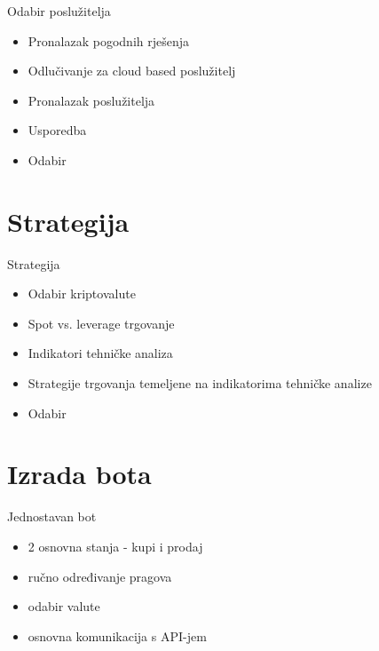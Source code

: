 \documentclass[aspectratio=169,xcolor=dvipsnames]{beamer}
\begin{document}
\begin{frame}{Odabir poslužitelja}
    \begin{itemize}
        \item Pronalazak pogodnih rješenja
        \item Odlučivanje za cloud based poslužitelj
        \item Pronalazak poslužitelja
        \item Usporedba
        \item Odabir
    \end{itemize}
\end{frame}

\section{Strategija}

\begin{frame}{Strategija}
    \begin{itemize}
        \item Odabir kriptovalute
        \item Spot vs. leverage trgovanje
        \item Indikatori tehničke analiza
        \item Strategije trgovanja temeljene na indikatorima tehničke analize
        \item Odabir
    \end{itemize}
\end{frame}

\section{Izrada bota}

\begin{frame}{Jednostavan bot}
    \begin{itemize}
        \item 2 osnovna stanja - kupi i prodaj
        \item ručno određivanje pragova
        \item odabir valute
        \item osnovna komunikacija s API-jem
        \end{itemize}
    \end{frame}
\end{document}
